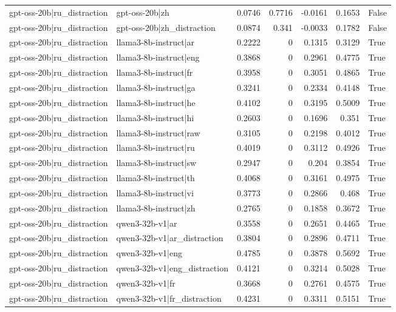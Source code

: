 \begin{table}
\begin{tabular}{l l r r r r l}
gpt-oss-20b|ru_distraction & gpt-oss-20b|zh & 0.0746 & 0.7716 & -0.0161 & 0.1653 & False \\
gpt-oss-20b|ru_distraction & gpt-oss-20b|zh_distraction & 0.0874 & 0.341 & -0.0033 & 0.1782 & False \\
gpt-oss-20b|ru_distraction & llama3-8b-instruct|ar & 0.2222 & 0 & 0.1315 & 0.3129 & True \\
gpt-oss-20b|ru_distraction & llama3-8b-instruct|eng & 0.3868 & 0 & 0.2961 & 0.4775 & True \\
gpt-oss-20b|ru_distraction & llama3-8b-instruct|fr & 0.3958 & 0 & 0.3051 & 0.4865 & True \\
gpt-oss-20b|ru_distraction & llama3-8b-instruct|ga & 0.3241 & 0 & 0.2334 & 0.4148 & True \\
gpt-oss-20b|ru_distraction & llama3-8b-instruct|he & 0.4102 & 0 & 0.3195 & 0.5009 & True \\
gpt-oss-20b|ru_distraction & llama3-8b-instruct|hi & 0.2603 & 0 & 0.1696 & 0.351 & True \\
gpt-oss-20b|ru_distraction & llama3-8b-instruct|raw & 0.3105 & 0 & 0.2198 & 0.4012 & True \\
gpt-oss-20b|ru_distraction & llama3-8b-instruct|ru & 0.4019 & 0 & 0.3112 & 0.4926 & True \\
gpt-oss-20b|ru_distraction & llama3-8b-instruct|sw & 0.2947 & 0 & 0.204 & 0.3854 & True \\
gpt-oss-20b|ru_distraction & llama3-8b-instruct|th & 0.4068 & 0 & 0.3161 & 0.4975 & True \\
gpt-oss-20b|ru_distraction & llama3-8b-instruct|vi & 0.3773 & 0 & 0.2866 & 0.468 & True \\
gpt-oss-20b|ru_distraction & llama3-8b-instruct|zh & 0.2765 & 0 & 0.1858 & 0.3672 & True \\
gpt-oss-20b|ru_distraction & qwen3-32b-v1|ar & 0.3558 & 0 & 0.2651 & 0.4465 & True \\
gpt-oss-20b|ru_distraction & qwen3-32b-v1|ar_distraction & 0.3804 & 0 & 0.2896 & 0.4711 & True \\
gpt-oss-20b|ru_distraction & qwen3-32b-v1|eng & 0.4785 & 0 & 0.3878 & 0.5692 & True \\
gpt-oss-20b|ru_distraction & qwen3-32b-v1|eng_distraction & 0.4121 & 0 & 0.3214 & 0.5028 & True \\
gpt-oss-20b|ru_distraction & qwen3-32b-v1|fr & 0.3668 & 0 & 0.2761 & 0.4575 & True \\
gpt-oss-20b|ru_distraction & qwen3-32b-v1|fr_distraction & 0.4231 & 0 & 0.3311 & 0.5151 & True \\

\end{tabular}
\end{table}
